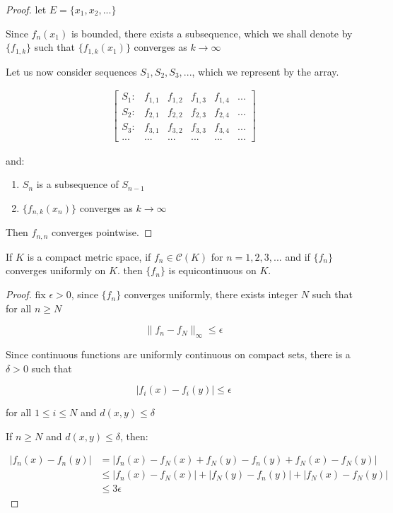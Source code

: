 \begin{proof}
   let $E = \{  x_1,x_2,...\}$ 
   
   Since $f_n(x_1)$ is bounded, there exists a subsequence, which we shall
   denote by $\{ f_{1,k}\}$ such that $\{ f_{1,k}(x_1)\}$ converges as $k \to \infty$

   Let us now consider sequences $S_1, S_2, S_3,...$, which we represent by the array.

   \begin{align*}
    \begin{bmatrix}
    S_1 : &  f_{1,1}  & f_{1,2} & f_{1,3} & f_{1,4} & ... \\
    S_2 : &  f_{2,1}  & f_{2,2} & f_{2,3} & f_{2,4} & ...\\
    S_3 : &  f_{3,1}  & f_{3,2} & f_{3,3} & f_{3,4} & ...\\
    ... & ... & ... & ...  & ...  & ... 
    \end{bmatrix}
   \end{align*}

   and:

   \begin{enumerate}
    \item $S_n$ is a subsequence of $S_{n-1}$
    \item $\{f_{n,k}(x_n)\}$ converges as $k \to \infty$
   \end{enumerate}

   Then $f_{n,n}$ converges pointwise.

\end{proof}

\begin{thm}
    If $K$ is a compact metric space, if $f_n \in \mathscr{C}(K)$ for $n = 1,2,3,...$
    and if $\{ f_n\}$ converges uniformly on $K$. then $\{ f_n\}$ is equicontinuous on $K$.
\end{thm}

\begin{proof}
    fix $\epsilon > 0$, since $\{ f_n\}$ converges uniformly, there exists integer $N$
    such that for all $n \ge N$

    \[
        \| f_n - f_N\|_\infty \le \epsilon
    \]

    Since continuous functions are uniformly continuous on compact sets, there is a $\delta > 0$ such that

    \[
        \left| f_i(x) - f_i(y) \right| \le \epsilon
    \]

    for all $1 \le i \le N$ and $d(x,y) \le \delta$

    If $n \ge N$ and $d(x,y) \le \delta$, then:

    \begin{align*}
        \left| f_n(x) - f_n(y) \right| &= \left| f_n(x) - f_N(x) + f_N(y) - f_n(y) + f_N(x) - f_N(y)\right| \\
        & \le \left| f_n(x) - f_N(x) \right| + \left| f_N(y) - f_n(y) \right|  +\left| f_N(x) - f_N(y) \right| \\
        & \le 3\epsilon
    \end{align*}
\end{proof}

